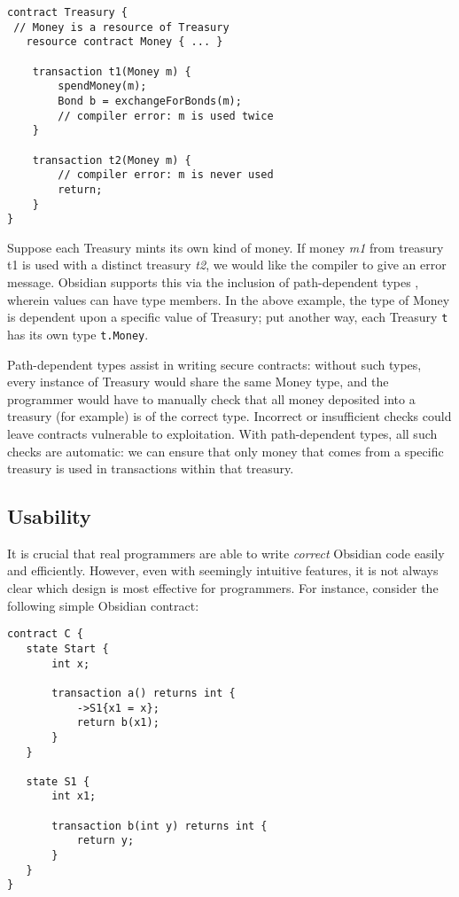 \documentclass[sigplan,10pt,review]{acmart}\settopmatter{printfolios=true}
\begin{document}
\begin{lstlisting}[caption={Linear resources in Obsidian},captionpos=b]
contract Treasury {
 // Money is a resource of Treasury
   resource contract Money { ... }

    transaction t1(Money m) {
        spendMoney(m);
        Bond b = exchangeForBonds(m);
        // compiler error: m is used twice
    }

    transaction t2(Money m) {
        // compiler error: m is never used
        return;
    }
}
\end{lstlisting}

Suppose each Treasury mints its own kind of money. If money \textit{m1} from treasury {t1} is used with a distinct treasury \textit{t2}, we would like the compiler to give an error message. Obsidian supports this via the inclusion of path-dependent types \cite{Amin}, wherein values can have type members. In the 
above example, the type of Money is dependent upon a specific value of Treasury; put another way, 
each Treasury \texttt{\small{t}} has its own type \texttt{\small{t.Money}}. 

Path-dependent types assist in writing secure contracts: without such types, every instance of 
Treasury would share the same Money type, and the programmer would have to manually check 
that all money deposited into a treasury (for example) is of the correct type. Incorrect or insufficient 
checks could leave contracts vulnerable to exploitation. With path-dependent types, all such checks 
are automatic: we can ensure that only money that comes from a specific treasury is used in 
transactions within that treasury. 

\subsection{Usability}
It is crucial that real programmers are able to write \textit{correct} Obsidian 
code easily and efficiently. However, even with seemingly intuitive features, it is not always clear 
which design is most effective for programmers. For instance, consider the following simple 
Obsidian contract:

\begin{lstlisting}
contract C {
   state Start {
       int x;
  
       transaction a() returns int {
           ->S1{x1 = x};
           return b(x1);
       }
   }
  
   state S1 {
       int x1;
      
       transaction b(int y) returns int {
           return y;
       }
   }
}
\end{lstlisting}
\end{document}
